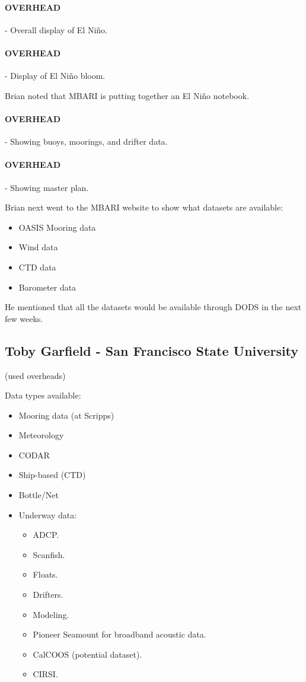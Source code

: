 \paragraph{OVERHEAD} - Overall display of El Ni\~no.

\paragraph{OVERHEAD} - Display of El Ni\~no bloom.

Brian noted that MBARI is putting together an El Ni\~no notebook.

\paragraph{OVERHEAD} - Showing buoys, moorings, and drifter data.

\paragraph{OVERHEAD} - Showing master plan.

Brian next went to the MBARI website to show what datasets are available:
\begin{itemize}
\item OASIS Mooring data
\item Wind data
\item CTD data
\item Barometer data
\end{itemize}

He mentioned that all the datasets would be available through DODS in the next few 
weeks.


\subsection{Toby Garfield - San Francisco State University}

(used overheads)

Data types available:
\begin{itemize}
\item Mooring data (at Scripps)
\item Meteorology
\item CODAR
\item Ship-based (CTD)
\item Bottle/Net
\item Underway data:
\begin{itemize}
\item ADCP.
\item Scanfish.
\item Floats.
\item Drifters.
\item Modeling.
\item Pioneer Seamount for broadband acoustic data.
\item CalCOOS (potential dataset).
\item CIRSI.
\end{itemize}
\end{itemize}

